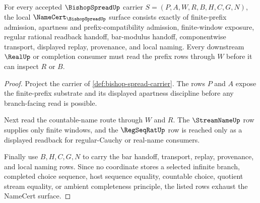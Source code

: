\begin{theorem}
\label{thm:bishop-spread-namecert-obligations}
For every accepted $\BishopSpreadUp$ carrier $S=(P,A,W,R,B,H,C,G,N)$, the local $\NameCert_{\BishopSpreadUp}$ surface consists exactly of finite-prefix admission, apartness and prefix-compatibility admission, finite-window exposure, regular rational readback handoff, bar-modulus handoff, componentwise transport, displayed replay, provenance, and local naming. Every downstream $\RealUp$ or completion consumer must read the prefix rows through $W$ before it can inspect $R$ or $B$.
\end{theorem}
\begin{proof}
Project the carrier of \autoref{def:bishop-spread-carrier}. The rows $P$ and $A$ expose the finite-prefix substrate and its displayed apartness discipline before any branch-facing read is possible.

Next read the countable-name route through $W$ and $R$. The $\StreamNameUp$ row supplies only finite windows, and the $\RegSeqRatUp$ row is reached only as a displayed readback for regular-Cauchy or real-name consumers.

Finally use $B,H,C,G,N$ to carry the bar handoff, transport, replay, provenance, and local naming rows. Since no coordinate stores a selected infinite branch, completed choice sequence, host sequence equality, countable choice, quotient stream equality, or ambient completeness principle, the listed rows exhaust the NameCert surface.
\end{proof}

